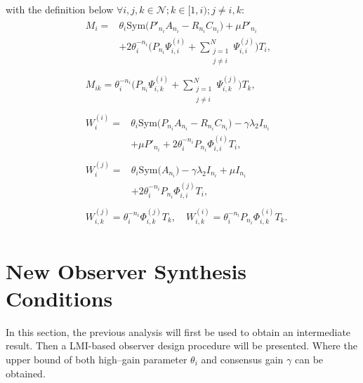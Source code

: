 \documentclass{ifacconf}
\begin{document}
with the definition below $\forall i,j,k\in\mathcal{N}; k\in[1,i); j\ne i,k$:
\begin{align}
    &\begin{aligned}\nonumber
         M_i = &\theta_i\mathrm{Sym}\big(P'_{n_i}A_{n_i}-R_{n_i}C_{n_i}\big)+\mu P'_{n_i}\\
        &+2\theta_i^{-n_i}\Bigg(P_{n_i}\Psi^{(i)}_{i,i}+\sum^{N}_{\substack{j=1\\j\ne i}}\Psi^{(j)}_{i,i}\Bigg)T_i,
    \end{aligned}\\
    &\begin{aligned}\nonumber
        M_{ik}=\theta_i^{-n_i}\Bigg(P_{n_i}\Psi^{(i)}_{i,k}+\sum^{N}_{\substack{j=1\\j\ne i}}\Psi^{(j)}_{i,k}\Bigg)T_k,
    \end{aligned}\\
    &\begin{aligned}\nonumber
        W_{i}^{(i)}=&\theta_i\mathrm{Sym}\big(P_{n_i}A_{n_i}-R_{n_i}C_{n_i}\big)-\gamma\lambda_2 I_{n_i}\\
        &+\mu P'_{n_i}+2\theta_i^{-n_i}P_{n_i}\Phi^{(i)}_{i,i}T_i,
    \end{aligned}\\
    &\begin{aligned}\nonumber
        W_{i}^{(j)}=&\theta_i\mathrm{Sym}\big(A_{n_i}\big)-\gamma\lambda_2 I_{n_i}+\mu I_{n_i}\\
        &+2\theta_i^{-n_i}P_{n_i}\Phi^{(j)}_{i,i}T_i,
    \end{aligned}\\
    &\begin{aligned}\nonumber
        W^{(j)}_{i,k}=\theta_i^{-n_i}\Phi^{(j)}_{i,k}T_k,\quad W^{(i)}_{i,k}=\theta_i^{-n_i}P_{n_i}\Phi^{(i)}_{i,k}T_k.
    \end{aligned}
\end{align}















\section{New Observer Synthesis Conditions}\label{sec:observer}
\vspace*{-0.3 cm}
In this section, the previous analysis will first be used to obtain an intermediate result. Then a LMI-based observer design procedure will be presented. Where the upper bound of both high--gain parameter $\theta_i$ and consensus gain $\gamma$ can be obtained.
\vspace*{-0.2 cm}
\end{document}
